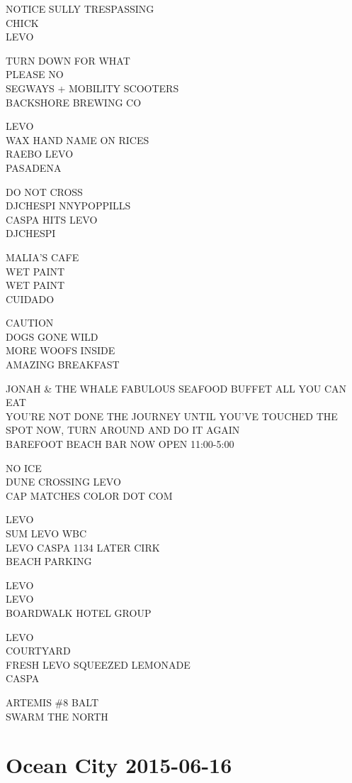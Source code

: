 \documentclass[10pt,letterpaper]{article}
\begin{document}
NOTICE SULLY TRESPASSING\\
CHICK\\
LEVO

TURN DOWN FOR WHAT\\
PLEASE NO\\
SEGWAYS + MOBILITY SCOOTERS\\
BACKSHORE BREWING CO

LEVO\\
WAX HAND NAME ON RICES\\
RAEBO LEVO\\
PASADENA

DO NOT CROSS\\
DJCHESPI NNYPOPPILLS\\
CASPA HITS LEVO\\
DJCHESPI

MALIA'S CAFE\\
WET PAINT\\
WET PAINT\\
CUIDADO

CAUTION\\
DOGS GONE WILD\\
MORE WOOFS INSIDE\\
AMAZING BREAKFAST

JONAH \& THE WHALE FABULOUS SEAFOOD BUFFET ALL YOU CAN EAT\\
YOU'RE NOT DONE THE JOURNEY UNTIL YOU'VE TOUCHED THE SPOT NOW, TURN AROUND AND DO IT AGAIN\\
BAREFOOT BEACH BAR NOW OPEN 11:00{-}5:00

NO ICE\\
DUNE CROSSING LEVO\\
CAP MATCHES COLOR DOT COM

LEVO\\
SUM LEVO WBC\\
LEVO CASPA 1134 LATER CIRK\\
BEACH PARKING

LEVO\\
LEVO\\
BOARDWALK HOTEL GROUP

LEVO\\
COURTYARD\\
FRESH LEVO SQUEEZED LEMONADE\\
CASPA

ARTEMIS \#8 BALT\\
SWARM THE NORTH
\

\section*{Ocean City 2015-06-16}
\end{document}
